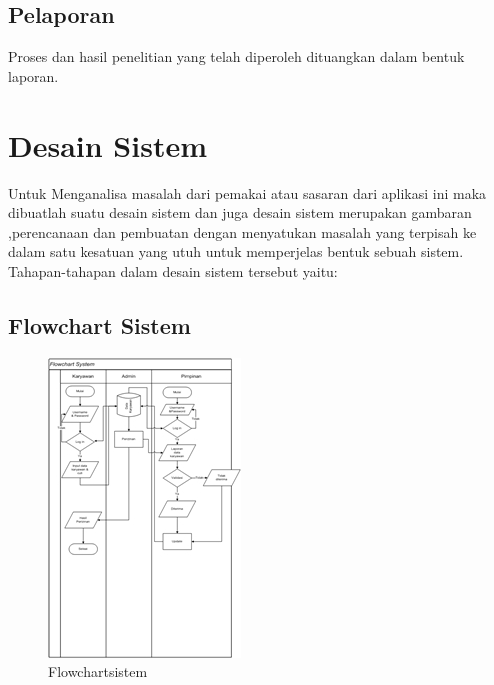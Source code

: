 \documentclass{jtetiproposalskripsi}
\begin{document}
\subsection{Pelaporan}
Proses dan hasil penelitian yang telah diperoleh dituangkan dalam bentuk laporan.
\section{Desain Sistem}
Untuk Menganalisa masalah dari pemakai atau sasaran dari aplikasi ini maka dibuatlah suatu desain sistem dan juga desain sistem merupakan gambaran ,perencanaan dan pembuatan dengan menyatukan masalah yang terpisah ke dalam satu kesatuan yang utuh untuk memperjelas bentuk sebuah sistem. Tahapan-tahapan dalam desain sistem tersebut yaitu:

\subsection{Flowchart Sistem}
 \begin{figure}[ht!]
  \centering
    \includegraphics{gambar/flow}
    \caption{Flowchartsistem}
    \label{flow}
\end{figure}
  
\end{document}
